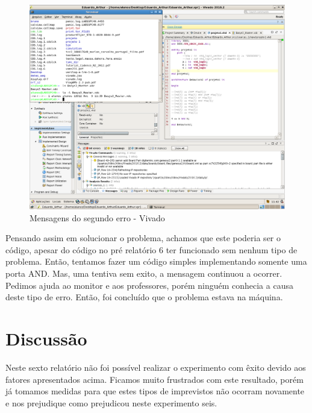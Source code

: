 \documentclass[12pts]{article}
\begin{document}
\clearpage
\begin{figure}[!htb]
  \centering
  \includegraphics[scale=0.30]{imagens/tretaPermissao.png}
  \caption{Mensagens do segundo erro - Vivado}	
  \label{figRotulo}
\end{figure}
	
	Pensando assim em solucionar o problema, achamos que este poderia ser o código, apesar do código no pré relatório 6 ter funcionado sem nenhum tipo de problema. Então, tentamos fazer um código simples implementando somente uma porta AND. Mas, uma tentiva sem exito, a mensagem continuou a ocorrer. Pedimos ajuda ao monitor e aos professores, porém ninguém conhecia a causa deste tipo de erro. Então, foi concluído que o problema estava na máquina.  


\section{Discussão}

      Neste sexto relatório não foi possível realizar o experimento com êxito devido aos fatores apresentados acima. Ficamos muito frustrados com este resultado, porém já tomamos medidas para que estes tipos de imprevistos não ocorram novamente e nos prejudique como prejudicou neste experimento seis.
\end{document}
